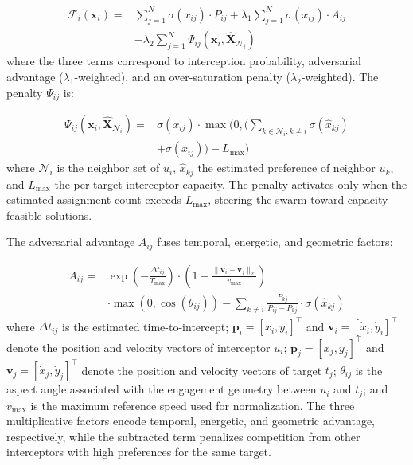 \documentclass[lettersize,journal]{IEEEtran}
\begin{document}
\begin{equation}
\label{eq:idbo_fitness}
\begin{split}
\mathcal{F}_i(\mathbf{x}_i) =& \sum_{j=1}^{N} \sigma(x_{ij}) \cdot P_{ij} + \lambda_1 \sum_{j=1}^{N} \sigma(x_{ij}) \cdot A_{ij} \\
&- \lambda_2 \sum_{j=1}^{N} \Psi_{ij}(\mathbf{x}_i, \hat{\mathbf{X}}_{\mathcal{N}_i})
\end{split}
\end{equation}
where the three terms correspond to interception probability, adversarial advantage ($\lambda_1$-weighted), and an over-saturation penalty ($\lambda_2$-weighted). The penalty $\Psi_{ij}$ is:

\begin{equation}
\label{eq:saturation_penalty}
\begin{split}
\Psi_{ij}(\mathbf{x}_i, \hat{\mathbf{X}}_{\mathcal{N}_i}) =& \sigma(x_{ij}) \cdot \max\Biggl(0, \Biggl(\sum_{k \in \mathcal{N}_i, k \neq i} \sigma(\hat{x}_{kj}) \\
&+ \sigma(x_{ij})\Biggr) - L_{\max}\Biggr)
\end{split}
\end{equation}
where $\mathcal{N}_i$ is the neighbor set of $u_i$, $\hat{x}_{kj}$ the estimated preference of neighbor $u_k$, and $L_{\max}$ the per-target interceptor capacity. The penalty activates only when the estimated assignment count exceeds $L_{\max}$, steering the swarm toward capacity-feasible solutions.

The adversarial advantage $A_{ij}$ fuses temporal, energetic, and geometric factors:

\begin{equation}
\label{eq:adversarial_advantage}
\begin{split}
A_{ij} =& \exp\left(-\frac{\Delta t_{ij}}{T_{\max}}\right) \cdot \left(1 - \frac{\|\mathbf{v}_i - \mathbf{v}_j\|_2}{v_{\max}}\right) \\
&\cdot \max\left(0, \cos(\theta_{ij})\right) - \sum_{k\neq i} \frac{P_{kj}}{P_{ij} + P_{kj}} \cdot \sigma(\hat{x}_{kj})
\end{split}
\end{equation}
where $\Delta t_{ij}$ is the estimated time-to-intercept; $\mathbf{p}_i=[x_i, y_i]^\top$ and $\mathbf{v}_i=[\dot{x}_i, \dot{y}_i]^\top$ denote the position and velocity vectors of interceptor $u_i$; $\mathbf{p}_j=[x_j, y_j]^\top$ and $\mathbf{v}_j=[\dot{x}_j, \dot{y}_j]^\top$ denote the position and velocity vectors of target $t_j$; $\theta_{ij}$ is the aspect angle associated with the engagement geometry between $u_i$ and $t_j$; and $v_{\max}$ is the maximum reference speed used for normalization. The three multiplicative factors encode temporal, energetic, and geometric advantage, respectively, while the subtracted term penalizes competition from other interceptors with high preferences for the same target.
\end{document}
